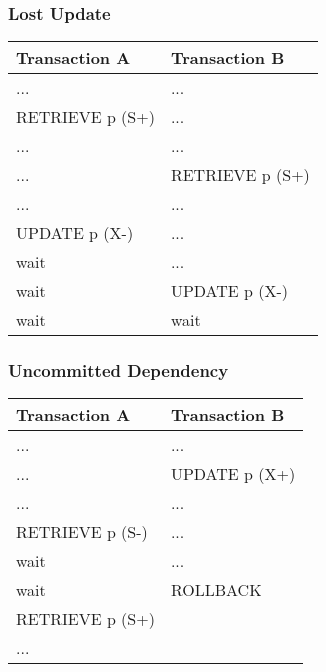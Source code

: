 \documentclass[dvipsnames]{beamer}
\theoremstyle{plain}
\begin{document}
\begin{frame}[fragile]
  \frametitle{Lost Update}

  \begin{table}
    \begin{tabular}{ll}
Transaction A   & Transaction B  \\\hline
...             & ...            \\\pause
RETRIEVE p (S+) & ...            \\\pause
...             & ...            \\
...             & RETRIEVE p (S+)\\\pause
...             & ...            \\
UPDATE p (X-)   & ...            \\
wait            & ...            \\\pause
wait            & UPDATE p (X-)  \\
wait            & wait
    \end{tabular}
  \end{table}
\end{frame}

\begin{frame}[fragile]
  \frametitle{Uncommitted Dependency}

  \begin{table}
    \begin{tabular}{ll}
Transaction A   & Transaction B\\\hline
...             & ...          \\\pause
...             & UPDATE p (X+)\\\pause
...             & ...          \\
RETRIEVE p (S-) & ...          \\
wait            & ...          \\\pause
wait            & ROLLBACK     \\
RETRIEVE p (S+) &              \\
...             &
    \end{tabular}
  \end{table}
\end{frame}
\end{document}
